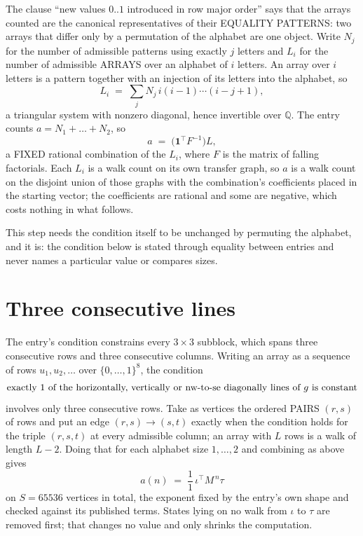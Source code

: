 \documentclass[11pt,a4paper]{article}
\theoremstyle{plain}
\theoremstyle{definition}
\begin{document}
The clause ``new values $0..1$ introduced in row major order'' says that the arrays
counted are the canonical representatives of their EQUALITY PATTERNS: two arrays that differ
only by a permutation of the alphabet are one object. Write $N_j$ for the number of admissible
patterns using exactly $j$ letters and $L_i$ for the number of admissible ARRAYS over an
alphabet of $i$ letters. An array over $i$ letters is a pattern together with an injection of
its letters into the alphabet, so
\[
L_i\;=\;\sum_{j}N_j\,i(i-1)\cdots(i-j+1),
\]
a triangular system with nonzero diagonal, hence invertible over $\mathbb{Q}$. The entry
counts $a=N_1+\dots+N_{2}$, so
\[
a\;=\;\bigl(\mathbf{1}^{\!\top}F^{-1}\bigr)L ,
\]
a FIXED rational combination of the $L_i$, where $F$ is the matrix of falling factorials.
Each $L_i$ is a walk count on its own transfer graph, so $a$ is a walk count on the disjoint
union of those graphs with the combination's coefficients placed in the starting vector; the
coefficients are rational and some are negative, which costs nothing in what follows.

This step needs the condition itself to be unchanged by permuting the alphabet, and it is:
the condition below is stated through equality between entries and never names a particular
value or compares sizes.

\section{Three consecutive lines}

The entry's condition constrains every $3\times3$ subblock, which spans three consecutive
rows and three consecutive columns. Writing an array as a sequence of rows
$u_1,u_2,\dots$ over $\{0,\dots,1\}^{8}$, the condition
\[
\text{exactly }1\text{ of the horizontally, vertically or nw-to-se diagonally lines of }g\text{ \text{is constant}}
\]
involves only three consecutive rows. Take as vertices the ordered PAIRS $(r,s)$ of
rows and put an edge $(r,s)\to(s,t)$ exactly when the condition holds for the triple
$(r,s,t)$ at every admissible column; an array with $L$ rows is a walk of length $L-2$.
Doing that for each alphabet size $1,\dots,2$ and combining as above gives
\[
a(n)\;=\;\frac{1}{1}\,\iota^{\!\top}M^{\,n}\tau
\]
on $S=65536$ vertices in total, the exponent fixed by the entry's own shape and checked against
its published terms. States lying on no walk from $\iota$ to $\tau$ are removed first; that
changes no value and only shrinks the computation.
\end{document}
